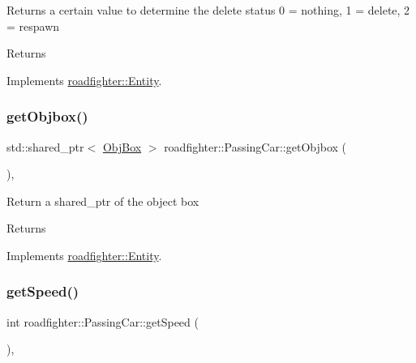 Returns a certain value to determine the delete status 0 = nothing, 1 = delete, 2 = respawn \begin{DoxyReturn}{Returns}

\end{DoxyReturn}


Implements \hyperlink{classroadfighter_1_1Entity_a08190b0b8e6a3fcdb42273d6096152ac}{roadfighter\+::\+Entity}.

\mbox{\label{classroadfighter_1_1PassingCar_aeee1f7e16dcef7adc0a4bea629b0d42b}} 
\subsubsection{\texorpdfstring{get\+Objbox()}{getObjbox()}}
{\footnotesize\ttfamily std\+::shared\+\_\+ptr$<$ \hyperlink{structObjBox}{Obj\+Box} $>$ roadfighter\+::\+Passing\+Car\+::get\+Objbox (\begin{DoxyParamCaption}{ }\end{DoxyParamCaption})\hspace{0.3cm}{\ttfamily [override]}, {\ttfamily [virtual]}}

Return a shared\+\_\+ptr of the object box \begin{DoxyReturn}{Returns}

\end{DoxyReturn}


Implements \hyperlink{classroadfighter_1_1Entity_af14340d04a725175a6d221f23c35fa0c}{roadfighter\+::\+Entity}.

\mbox{\label{classroadfighter_1_1PassingCar_afae62d9c6037d5ce8f74bb2e2ed363ac}} 
\subsubsection{\texorpdfstring{get\+Speed()}{getSpeed()}}
{\footnotesize\ttfamily int roadfighter\+::\+Passing\+Car\+::get\+Speed (\begin{DoxyParamCaption}{ }\end{DoxyParamCaption})\hspace{0.3cm}{\ttfamily [override]}, {\ttfamily [virtual]}}

